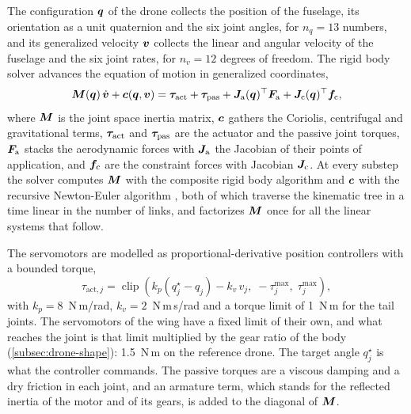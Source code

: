 The configuration $\bm{q}$ of the drone collects the position of the fuselage, its orientation as a unit quaternion and the six joint angles, for $n_q = 13$ numbers, and its generalized velocity $\bm{v}$ collects the linear and angular velocity of the fuselage and the six joint rates, for $n_v = 12$ degrees of freedom. The rigid body solver advances the equation of motion in generalized coordinates,
\begin{equation}
\bm{M}(\bm{q})\,\dot{\bm{v}} + \bm{c}(\bm{q}, \bm{v}) = \bm{\tau}_{\mathrm{act}} + \bm{\tau}_{\mathrm{pas}} + \bm{J}_{\mathrm{a}}(\bm{q})^{\top} \bm{F}_{\mathrm{a}} + \bm{J}_{\mathrm{c}}(\bm{q})^{\top} \bm{f}_{\mathrm{c}},
\label{eq:eom}
\end{equation}
where $\bm{M}$ is the joint space inertia matrix, $\bm{c}$ gathers the Coriolis, centrifugal and gravitational terms, $\bm{\tau}_{\mathrm{act}}$ and $\bm{\tau}_{\mathrm{pas}}$ are the actuator and the passive joint torques, $\bm{F}_{\mathrm{a}}$ stacks the aerodynamic forces with $\bm{J}_{\mathrm{a}}$ the Jacobian of their points of application, and $\bm{f}_{\mathrm{c}}$ are the constraint forces with Jacobian $\bm{J}_{\mathrm{c}}$. At every substep the solver computes $\bm{M}$ with the composite rigid body algorithm and $\bm{c}$ with the recursive Newton-Euler algorithm \cite{featherstone2008rigid}, both of which traverse the kinematic tree in a time linear in the number of links, and factorizes $\bm{M}$ once for all the linear systems that follow.

The servomotors are modelled as proportional-derivative position controllers with a bounded torque,
\begin{equation}
\tau_{\mathrm{act},j} = \operatorname{clip}\!\left( k_p \left(q_j^{\star} - q_j\right) - k_v\, v_j,\; -\tau_j^{\max},\; \tau_j^{\max} \right),
\label{eq:servo}
\end{equation}
with $k_p = 8$~N\,m/rad, $k_v = 2$~N\,m\,s/rad and a torque limit of 1~N\,m for the tail joints. The servomotors of the wing have a fixed limit of their own, and what reaches the joint is that limit multiplied by the gear ratio of the body (\autoref{subsec:drone-shape}): 1.5~N\,m on the reference drone. The target angle $q_j^{\star}$ is what the controller commands. The passive torques are a viscous damping and a dry friction in each joint, and an armature term, which stands for the reflected inertia of the motor and of its gears, is added to the diagonal of $\bm{M}$.

